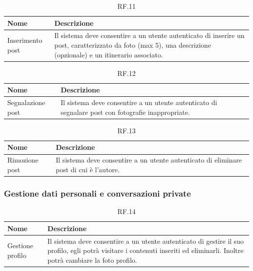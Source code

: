 \documentclass{natourDoc}
\begin{document}
\begin{table}[H]
	\centering
	\begin{tabular}{ |p{5cm}|p{10.3cm}| }
		\hline
		\rowcolor{PineGreen!70}
		\textbf{Nome}    & \textbf{Descrizione}                                                    \\
		\hline
		Inserimento post & Il sistema deve consentire a un utente autenticato di inserire un post,
		caratterizzato da foto (max 5), una descrizione (opzionale) e un itinerario associato.     \\
		\hline
	\end{tabular}
	\caption{RF.11}
	\label{table:11}
\end{table}


\begin{table}[H]
	\centering
	\begin{tabular}{ |p{5cm}|p{10.3cm}| }
		\hline
		\rowcolor{PineGreen!70}
		\textbf{Nome}     & \textbf{Descrizione}                                                                \\
		\hline
		Segnalazione post & Il sistema deve consentire a un utente autenticato di segnalare post con fotografie
		inappropriate.                                                                                          \\
		\hline
	\end{tabular}
	\caption{RF.12}
	\label{table:12}
\end{table}

\begin{table}[H]
	\centering
	\begin{tabular}{ |p{5cm}|p{10.3cm}| }
		\hline
		\rowcolor{PineGreen!70}
		\textbf{Nome}  & \textbf{Descrizione}                                                        \\
		\hline
		Rimozione post & Il sistema deve consentire a un utente autenticato di eliminare post di cui
		è l'autore.                                                                                  \\
		\hline
	\end{tabular}
	\caption{RF.13}
	\label{table:13}
\end{table}

\subsubsection{Gestione dati personali e conversazioni private}
\begin{table}[H]
	\centering
	\begin{tabular}{ |p{5cm}|p{10.3cm}| }
		\hline
		\rowcolor{PineGreen!70}
		\textbf{Nome}    & \textbf{Descrizione}                                                          \\
		\hline
		Gestione profilo & Il sistema deve consentire a un utente autenticato di gestire il suo profilo,
		egli potrà visitare i contenuti inseriti ed eliminarli. Inoltre potrà cambiare la foto profilo.  \\
		\hline
	\end{tabular}
	\caption{RF.14}
	\label{table:14}
\end{table}
\end{document}
